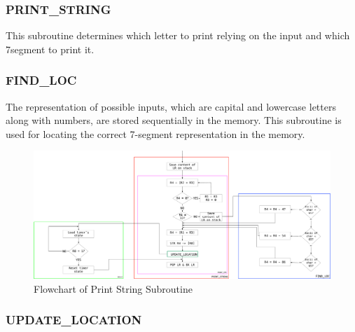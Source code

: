 \documentclass[titlepage]{article}
\begin{document}
	\subsubsection{PRINT\_STRING}
	This subroutine determines which letter to print relying on the input and which 7segment to print it.
	\subsubsection{FIND\_LOC}
	The representation of possible inputs, which are capital and lowercase letters along with numbers, are stored sequentially in the memory. This subroutine is used for locating the correct 7-segment representation in the memory.
	\begin{figure}[h]
		\centering
		\includegraphics[scale=.2]{../images/print_string.pdf}
		\caption{Flowchart of Print String Subroutine}
	\end{figure}
	\subsubsection{UPDATE\_LOCATION}
	
\end{document}
